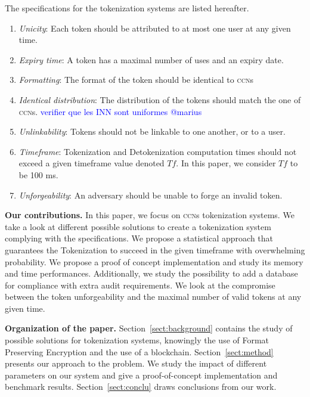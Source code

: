 \documentclass{llncs}
\newcounter{prob}
\begin{document}
The specifications for the tokenization systems are listed hereafter.
\begin{enumerate}
    \item \label{item-spec-disting} \textit{Unicity}: Each token should be attributed to at most one user at any given time.
    \item \textit{Expiry time}: A token has a maximal number of uses and an expiry date.
    \item \label{item-spec-format-ccn} \textit{Formatting}: The format of the token should be identical to \textsc{ccn}s 
    \item \textit{Identical distribution}: The distribution of the tokens should match the one of \textsc{ccn}s. \textcolor{blue}{verifier que les INN sont uniformes @marius}
    \item \label{item-spec-linkable} \textit{Unlinkability}: Tokens should not be linkable to one another, or to a user.
    \item \label{item-spec-time} \textit{Timeframe}: Tokenization and Detokenization computation times should not exceed a given timeframe value denoted $Tf$. In this paper, we consider $Tf$ to be 100 ms.
    \item \textit{Unforgeability}: An adversary should be unable to forge an invalid token.
\end{enumerate}

\noindent\textbf{Our contributions.}
In this paper, we focus on \textsc{ccn}s tokenization systems. We take a look at different possible solutions to create a tokenization system complying with the specifications. We propose a statistical approach that guarantees the Tokenization to succeed in the given timeframe with overwhelming probability. We propose a proof of concept implementation and study its memory and time performances.
Additionally, we study the possibility to add a database for compliance with extra audit requirements. We look at the compromise between the token unforgeability and the maximal number of valid tokens at any given time.

\smallskip

\noindent\textbf{Organization of the paper. }
Section~\ref{sect:background} contains the study of possible solutions for tokenization systems, knowingly the use of Format Preserving Encryption and the use of a blockchain.
Section~\ref{sect:method} presents our approach to the problem. We study the impact of different parameters on our system and give a proof-of-concept implementation and benchmark results.
Section~\ref{sect:conclu} draws conclusions from our work.
\end{document}
